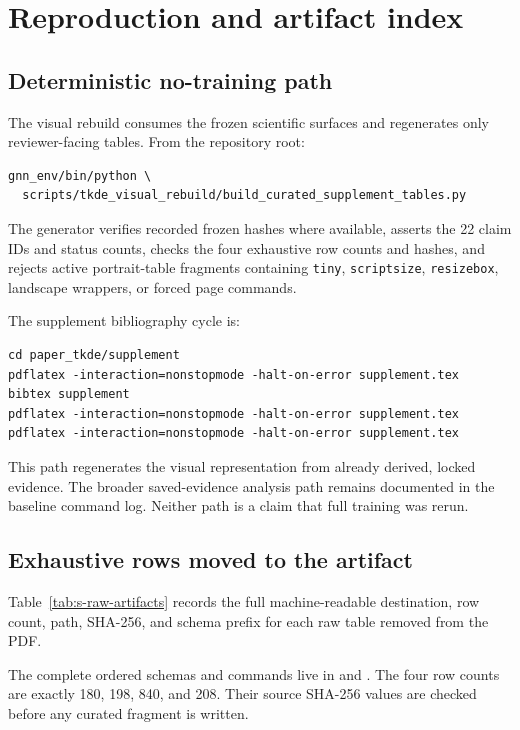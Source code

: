 \section{Reproduction and artifact index}
\label{sec:s-reproduction-artifact}

\subsection{Deterministic no-training path}

The visual rebuild consumes the frozen scientific surfaces and regenerates only reviewer-facing tables. From the repository root:

\begin{verbatim}
gnn_env/bin/python \
  scripts/tkde_visual_rebuild/build_curated_supplement_tables.py
\end{verbatim}

The generator verifies recorded frozen hashes where available, asserts the 22 claim IDs and status counts, checks the four exhaustive row counts and hashes, and rejects active portrait-table fragments containing \texttt{tiny}, \texttt{scriptsize}, \texttt{resizebox}, landscape wrappers, or forced page commands.

The supplement bibliography cycle is:

\begin{verbatim}
cd paper_tkde/supplement
pdflatex -interaction=nonstopmode -halt-on-error supplement.tex
bibtex supplement
pdflatex -interaction=nonstopmode -halt-on-error supplement.tex
pdflatex -interaction=nonstopmode -halt-on-error supplement.tex
\end{verbatim}

This path regenerates the visual representation from already derived, locked evidence. The broader saved-evidence analysis path remains documented in the baseline command log. Neither path is a claim that full training was rerun.

\subsection{Exhaustive rows moved to the artifact}

Table~\ref{tab:s-raw-artifacts} records the full machine-readable destination, row count, path, SHA-256, and schema prefix for each raw table removed from the PDF.



The complete ordered schemas and commands live in  and . The four row counts are exactly 180, 198, 840, and 208. Their source SHA-256 values are checked before any curated fragment is written.

